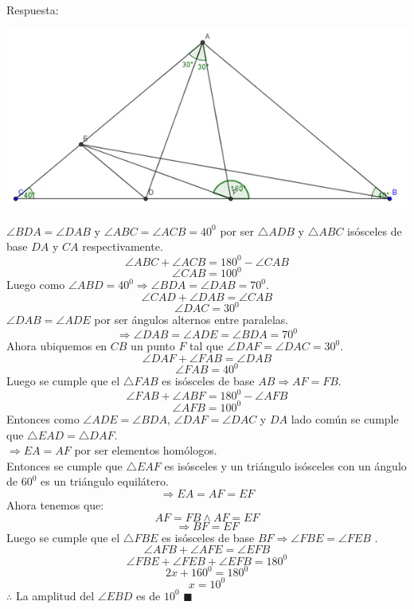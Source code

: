 \documentclass{book}
\begin{document}
\begin{enumerate}
          Respuesta:
          \begin{center}
              \includegraphics[scale=1]{imagenes/Geometria/7.png}
          \end{center}
          $\angle BDA=\angle DAB$  y $\angle ABC=\angle ACB=40^0$  por ser $\triangle ADB$ y $\triangle ABC$ isósceles de base $DA$ y $CA$ respectivamente.
          $$\angle ABC+\angle ACB=180^0-\angle CAB$$
          $$\angle CAB=100^0$$
          Luego como $\angle ABD=40^0\Rightarrow\angle BDA=\angle DAB=70^0$.
          $$\angle CAD+\angle DAB=\angle CAB$$
          $$\angle DAC=30^0$$
          $\angle DAB=\angle ADE$ por ser ángulos alternos entre paralelas.
          $$\Rightarrow\angle DAB=\angle ADE=\angle BDA=70^0$$
          Ahora ubiquemos en $CB$ un punto $F$ tal que $\angle DAF=\angle DAC=30^0$.
          $$\angle DAF+\angle FAB=\angle DAB$$
          $$\angle FAB=40^0$$
          Luego se cumple que el $\triangle FAB$ es isósceles de base $AB  \Rightarrow  AF=FB$.
          $$\angle FAB+\angle ABF=180^0-\angle AFB$$
          $$\angle AFB=100^0$$
          Entonces como $\angle ADE=\angle BDA$, $\angle DAF=\angle DAC$ y $DA$ lado común se cumple que $\triangle EAD=\triangle DAF$. \\
          $\Rightarrow  EA=AF$ por ser elementos homólogos.\\
          Entonces se cumple que $\triangle EAF$ es isósceles y un triángulo isósceles con un ángulo de $60^0$ es un triángulo equilátero.
          $$\Rightarrow  EA=AF=EF$$
          Ahora tenemos que:
          $$AF=FB \wedge AF=EF$$
          $$\Rightarrow  BF=EF$$
          Luego se cumple que el $\triangle FBE$ es isósceles de base $BF  \Rightarrow \angle FBE=\angle FEB$ .
          $$\angle AFB+\angle AFE=\angle EFB$$
          $$\angle FBE+\angle FEB+\angle EFB=180^0$$
          $$2x+160^0=180^0$$
          $$x=10^0$$
          $\therefore$ La amplitud del $\angle EBD$ es de $10^0$ $\blacksquare$\\

\end{enumerate}
\end{document}
